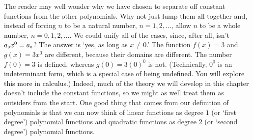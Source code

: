 \documentclass{ximera}
\begin{document}
The reader may well wonder why we have chosen to separate off constant functions from the other polynomials.  Why not just lump them all together and, instead of forcing $n$ to be a natural number, $n = 1, 2, \ldots$, allow $n$ to be a whole number, $n = 0, 1, 2, \ldots$.  We could unify all of the cases, since, after all, isn't $a_{\mbox{\tiny $0$}}x^{0} = a_{\mbox{\tiny $0$}}$?  The answer is `yes, as long as $x\neq 0$.'  The function $f(x) = 3$ and $g(x) = 3x^{0}$ are different, because their domains are different.  The number $f(0) = 3$ is defined, whereas $g(0) = 3(0)^{0}$ is not.  (Technically, $0^{0}$ is an indeterminant form, which is a special case of being undefined.  You will explore this more in calculus.)  Indeed, much of the theory we will develop in this chapter doesn't include the constant functions, so we might as well treat them as outsiders from the start.  One good thing that comes from our definition of polynomials is that we can now think of linear functions as degree $1$ (or `first degree') polynomial functions and quadratic functions as degree $2$ (or `second degree') polynomial functions.
\end{document}
